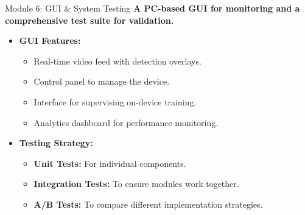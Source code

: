 \documentclass{beamer}
\begin{document}
\begin{frame}{Module 6: GUI & System Testing}
    \textbf{A PC-based GUI for monitoring and a comprehensive test suite for validation.}
    \begin{itemize}
        \item \textbf{GUI Features:}
        \begin{itemize}
            \item Real-time video feed with detection overlays.
            \item Control panel to manage the device.
            \item Interface for supervising on-device training.
            \item Analytics dashboard for performance monitoring.
        \end{itemize}
        \item \textbf{Testing Strategy:}
        \begin{itemize}
            \item \textbf{Unit Tests:} For individual components.
            \item \textbf{Integration Tests:} To ensure modules work together.
            \item \textbf{A/B Tests:} To compare different implementation strategies.
        \end{itemize}
    \end{itemize}
\end{frame}

\end{document}
